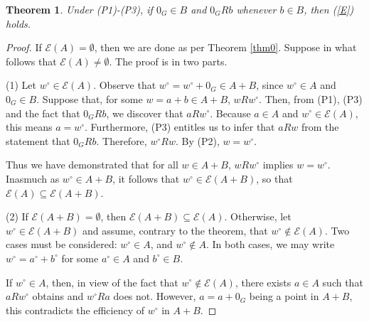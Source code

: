 \documentclass[pdflatex,sn-apa,11pt]{sn-jnl}%
\newtheorem{theorem}{Theorem}%
\begin{document}
\begin{theorem}
\label{thm1}
Under (P1)-(P3), if $0_{G} \in B$ and $0_{G} R b$ whenever $b \in B$, then (\ref{E}) holds.
\end{theorem}

\begin{proof}
If $\mathscr{E}(A) = \emptyset$, then we are done as per Theorem \ref{thm0}. Suppose in what follows that $\mathscr{E}(A) \neq \emptyset$. The proof is in two parts.

(1) %
Let $w^{\circ} \in \mathscr{E}(A)$. Observe that $w^{\circ} = w^{\circ} + 0_{G} \in A + B$, since $w^{\circ} \in A$ and $0_{G} \in B$. Suppose that, for some $w = a + b \in A + B$, $wRw^{\circ}$. Then, from (P1), (P3) and the fact that $0_{G}Rb$, we discover that $aRw^{\circ}$. Because $a \in A$ and $w^{\circ} \in \mathscr{E}(A)$, this means $a = w^{\circ}$. Furthermore, (P3) entitles us to infer that $aRw$ from the statement that $0_GRb$. Therefore, $w^{\circ}Rw$. By (P2), $w = w^{\circ}$. %

Thus we have demonstrated that for all $w \in A+B$, $wRw^{\circ}$ implies $w = w^{\circ}$. Inasmuch as $w^{\circ} \in A + B$, it follows that $w^{\circ} \in \mathscr{E}(A+B)$, so that $\mathscr{E}(A) \subseteq \mathscr{E}(A+B)$. 

(2) If $\mathscr{E}(A+B) = \emptyset$, then $\mathscr{E}(A+B) \subseteq \mathscr{E}(A)$. Otherwise, let $w^{\circ} \in \mathscr{E}(A+B)$ and assume, contrary to the theorem, that $w^{\circ} \notin \mathscr{E}(A)$. Two cases must be considered: $w^{\circ} \in A$, and $w^{\circ} \notin A$. In both cases, we may write $w^{\circ} = a^{\circ} + b^{\circ}$ for some $a^{\circ} \in A$ and $b^{\circ} \in B$.

If $w^{\circ} \in A$, then, in view of the fact that $w^{\circ} \notin \mathscr{E}(A)$, there exists $a \in A$ such that $aRw^{\circ}$ obtains and $w^{\circ}Ra$ does not. However, $a = a + 0_{G}$ being a point in $A + B$, this contradicts the efficiency of $w^{\circ}$ in $A+B$.



\end{proof}
\end{document}
